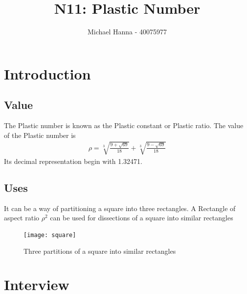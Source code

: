 \documentclass{report}
\title{N11: Plastic Number}
\author{Michael Hanna - 40075977 }
\date{}
\begin{document}
\maketitle
\tableofcontents

\chapter{Introduction}
\section{Value}
The Plastic number is known as the Plastic constant or Plastic ratio.\newline
\newline The value of the Plastic number is
\begin{eqnarray}
{\displaystyle \rho ={\sqrt[{3}]{\frac {9+{\sqrt {69}}}{18}}}+{\sqrt[{3}]{\frac {9-{\sqrt {69}}}{18}}}}
\end{eqnarray}
\newline Its decimal representation begin with 1.32471.\citep{pn}
\section{Uses}
It can be a way of partitioning a square into three rectangles.\newline
\newline A Rectangle of aspect ratio ${\rho}^2$  can be used for dissections of a square into similar rectangles \citep{pn}


\begin{figure}[h!]
\centering
\texttt{[image: square]}
\caption{Three partitions of a square into similar rectangles}
\label{fig:squares}
\end{figure}


\newpage
\newenvironment{qanda}{\setlength{\parindent}{0pt}}{\bigskip}
\newcommand{\Q}{\bigskip\bfseries Q: }
\newcommand{\A}{\par\textbf{A:} \normalfont}
 


\chapter{Interview}
\end{document}
